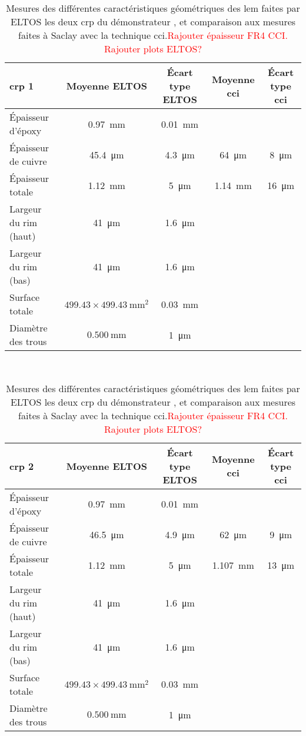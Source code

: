        \begin{table}
          \centering
          \begin{tabular}{|l|c|c||c|c|}
            \hline
            \gls{crp} 1 & Moyenne ELTOS & Écart type ELTOS & Moyenne \gls{cci} & Écart type \gls{cci}\\
            \hline
            Épaisseur d'époxy & \SI{0.97}{\milli\meter} & \SI{0.01}{\milli\meter} & &\\
            Épaisseur de cuivre & \SI{45.4}{\micro\meter} & \SI{4.3}{\micro\meter} & \SI{64}{\micro\meter} & \SI{8}{\micro\meter}\\
            Épaisseur totale & \SI{1.12}{\milli\meter} &  \SI{5}{\micro\meter} & \SI{1.14}{\milli\meter} &  \SI{16}{\micro\meter}\\
            Largeur du rim (haut)& \SI{41}{\micro\meter} & \SI{1.6}{\micro\meter} & &\\
            Largeur du rim (bas)& \SI{41}{\micro\meter} & \SI{1.6}{\micro\meter} & &\\
            Surface totale &  $499.43\times\SI{499.43}{\milli\meter\squared}$ & \SI{0.03}{\milli\meter} & &\\
            Diamètre des trous & $\SI{0.500}{\milli\meter}$ & \SI{1}{\micro\meter} & &\\
            \hline
          \end{tabular}\\
          \begin{tabular}{|l|c|c||c|c|}
            \hline
            \gls{crp} 2 & Moyenne ELTOS & Écart type ELTOS & Moyenne \gls{cci} & Écart type \gls{cci}\\
            \hline
            Épaisseur d'époxy & \SI{0.97}{\milli\meter} & \SI{0.01}{\milli\meter} & &\\
            Épaisseur de cuivre & \SI{46.5}{\micro\meter} & \SI{4.9}{\micro\meter} & \SI{62}{\micro\meter} & \SI{9}{\micro\meter} \\
            Épaisseur totale & \SI{1.12}{\milli\meter} &  \SI{5}{\micro\meter} & \SI{1.107}{\milli\meter} & \SI{13}{\micro\meter}\\
            Largeur du rim (haut)& \SI{41}{\micro\meter} & \SI{1.6}{\micro\meter} & &\\
            Largeur du rim (bas)& \SI{41}{\micro\meter} & \SI{1.6}{\micro\meter} & &\\
            Surface totale &  $499.43\times\SI{499.43}{\milli\meter\squared}$ & \SI{0.03}{\milli\meter} & &\\
            Diamètre des trous & $\SI{0.500}{\milli\meter}$ & \SI{1}{\micro\meter} & &\\
            \hline
          \end{tabular}
          \caption[Mesures des différentes caractéristiques géométriques des \gls{lem}]{Mesures des différentes caractéristiques géométriques des \gls{lem} faites par ELTOS les deux \gls{crp} du démonstrateur \SSS{}, et comparaison aux mesures faites à Saclay avec la technique \gls{cci}.\label{tab::mesures_eltos} \textcolor{red}{Rajouter épaisseur FR4 CCI. Rajouter plots ELTOS?}}
        \end{table}
            
